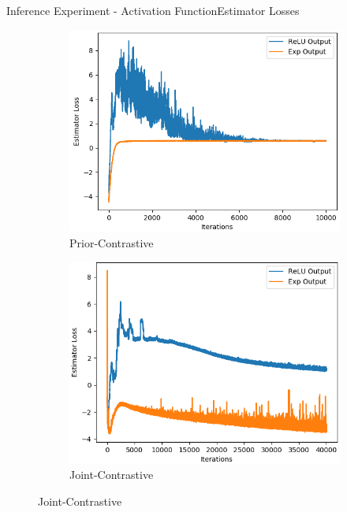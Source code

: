 \documentclass{beamer}
\begin{document}
\begin{frame}{Inference Experiment - Activation Function}{Estimator Losses}
\begin{figure}
\begin{subfigure}{0.49\textwidth}
\includegraphics[width=\linewidth]{estimator_losses/PCKLvsPCKLEXP.png}
\caption{Prior-Contrastive}
\end{subfigure}
\begin{subfigure}{0.49\textwidth}
\includegraphics[width=\linewidth]{estimator_losses/JCKLvsJCKLEXP.png}
\caption{Joint-Contrastive}
\end{subfigure}
\end{figure}
\end{frame}
\end{document}
